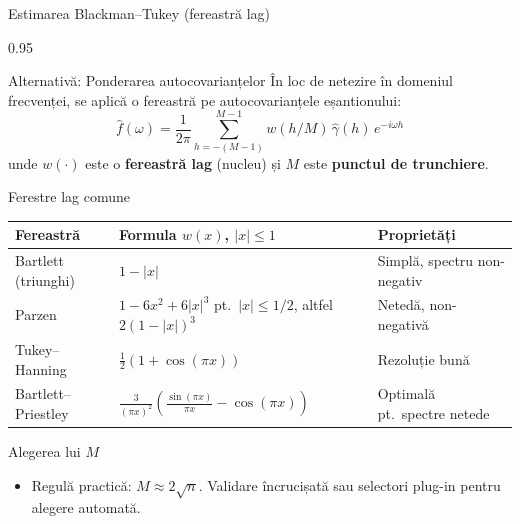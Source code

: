 \documentclass[9pt, aspectratio=169, t]{beamer}
\begin{document}
\begin{frame}{Estimarea Blackman--Tukey (fereastră lag)}
    \begin{cminipage}{0.95\textwidth}
    \vspace{-2mm}
    \begin{block}{Alternativă: Ponderarea autocovarianțelor}
        {\small În loc de netezire în domeniul frecvenței, se aplică o fereastră pe autocovarianțele eșantionului:
        \[
            \hat{f}(\omega) = \frac{1}{2\pi}\sum_{h=-(M-1)}^{M-1} w(h/M)\,\hat{\gamma}(h)\,e^{-i\omega h}
        \]
        unde $w(\cdot)$ este o \textbf{fereastră lag} (nucleu) și $M$ este \textbf{punctul de trunchiere}.}
    \end{block}
    \vspace{-2mm}
    {\scriptsize
    \begin{block}{Ferestre lag comune}
    \vspace{-2mm}
    \begin{center}
    \begin{tabular}{l|l|l}
        \toprule
        \textbf{Fereastră} & \textbf{Formula $w(x)$, $|x| \leq 1$} & \textbf{Proprietăți} \\
        \midrule
        Bartlett (triunghi) & $1 - |x|$ & Simplă, spectru non-negativ \\
        Parzen & $1 - 6x^2 + 6|x|^3$ pt.\ $|x| \leq 1/2$, altfel $2(1-|x|)^3$ & Netedă, non-negativă \\
        Tukey--Hanning & $\frac{1}{2}(1 + \cos(\pi x))$ & Rezoluție bună \\
        Bartlett--Priestley & $\frac{3}{(\pi x)^2}\left(\frac{\sin(\pi x)}{\pi x} - \cos(\pi x)\right)$ & Optimală pt.\ spectre netede \\
        \bottomrule
    \end{tabular}
    \end{center}
    \end{block}
    }
    \vspace{-4mm}
    \begin{exampleblock}{Alegerea lui $M$}
        \begin{itemize}\setlength{\itemsep}{-2pt}
            \item {\small Regulă practică: $M \approx 2\sqrt{n}$. Validare încrucișată sau selectori plug-in pentru alegere automată.}
        \end{itemize}
    \end{exampleblock}
    \end{cminipage}
\end{frame}
\end{document}
